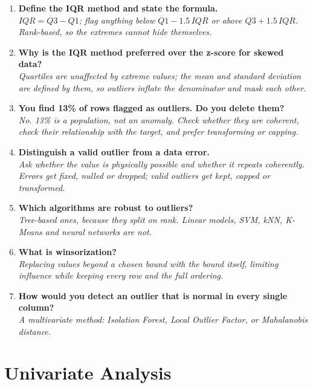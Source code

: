\documentclass[11pt,a4paper]{article}
\begin{document}
\begin{enumerate}\itemsep4pt
  \item \textbf{Define the IQR method and state the formula.}\\
        \emph{$IQR = Q3 - Q1$; flag anything below $Q1 - 1.5\,IQR$ or above
        $Q3 + 1.5\,IQR$. Rank-based, so the extremes cannot hide themselves.}
  \item \textbf{Why is the IQR method preferred over the z-score for skewed data?}\\
        \emph{Quartiles are unaffected by extreme values; the mean and standard deviation
        are defined by them, so outliers inflate the denominator and mask each other.}
  \item \textbf{You find 13\% of rows flagged as outliers. Do you delete them?}\\
        \emph{No. 13\% is a population, not an anomaly. Check whether they are coherent,
        check their relationship with the target, and prefer transforming or capping.}
  \item \textbf{Distinguish a valid outlier from a data error.}\\
        \emph{Ask whether the value is physically possible and whether it repeats
        coherently. Errors get fixed, nulled or dropped; valid outliers get kept, capped or
        transformed.}
  \item \textbf{Which algorithms are robust to outliers?}\\
        \emph{Tree-based ones, because they split on rank. Linear models, SVM, kNN, K-Means
        and neural networks are not.}
  \item \textbf{What is winsorization?}\\
        \emph{Replacing values beyond a chosen bound with the bound itself, limiting
        influence while keeping every row and the full ordering.}
  \item \textbf{How would you detect an outlier that is normal in every single column?}\\
        \emph{A multivariate method: Isolation Forest, Local Outlier Factor, or Mahalanobis
        distance.}
\end{enumerate}


\newpage
\section{Univariate Analysis}

\end{document}
